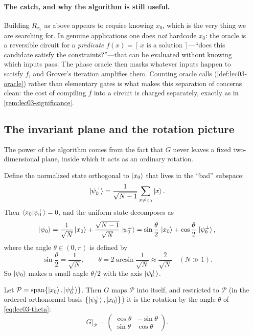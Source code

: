\paragraph{The catch, and why the algorithm is still useful.}
Building $R_{x_0}$ as above appears to require knowing $x_0$, which is the very
thing we are searching for. In genuine applications one does \emph{not} hardcode
$x_0$: the oracle is a reversible circuit for a \emph{predicate}
$f(x)=[\,x\text{ is a solution}\,]$---``does this candidate satisfy the
constraints?''---that can be evaluated without knowing which inputs pass. The
phase oracle then marks whatever inputs happen to satisfy $f$, and Grover's
iteration amplifies them. Counting oracle calls (\cref{def:lec03-oracle}) rather
than elementary gates is what makes this separation of concerns clean: the cost of
compiling $f$ into a circuit is charged separately, exactly as in
\cref{rem:lec03-significance}.

\subsection{The invariant plane and the rotation picture}

The power of the algorithm comes from the fact that $G$ never leaves a fixed
two-dimensional plane, inside which it acts as an ordinary rotation.

Define the normalized state orthogonal to $\ket{x_0}$ that lives in the ``bad''
subspace:
\[
  \ket{\psi_0^{\perp}}
    =\frac{1}{\sqrt{N-1}}\sum_{x\neq x_0}\ket{x}.
\]
Then $\braket{x_0|\psi_0^{\perp}}=0$, and the uniform state decomposes as
\begin{equation}
  \ket{\psi_0}
    =\frac{1}{\sqrt N}\ket{x_0}+\frac{\sqrt{N-1}}{\sqrt N}\ket{\psi_0^{\perp}}
    =\sin\frac{\theta}{2}\,\ket{x_0}+\cos\frac{\theta}{2}\,\ket{\psi_0^{\perp}},
  \label{eq:lec03-initdecomp}
\end{equation}
where the angle $\theta\in(0,\pi)$ is defined by
\begin{equation}
  \sin\frac{\theta}{2}=\frac{1}{\sqrt N},
  \qquad
  \theta=2\arcsin\frac{1}{\sqrt N}\approx\frac{2}{\sqrt N}\quad(N\gg1).
  \label{eq:lec03-theta}
\end{equation}
So $\ket{\psi_0}$ makes a small angle $\theta/2$ with the axis
$\ket{\psi_0^{\perp}}$.

\begin{theorem}
\label{thm:lec03-rotation}
Let $\mathcal{P}=\operatorname{span}\{\ket{x_0},\ket{\psi_0^{\perp}}\}$. Then $G$
maps $\mathcal{P}$ into itself, and restricted to $\mathcal{P}$ (in the ordered
orthonormal basis $\{\ket{\psi_0^{\perp}},\ket{x_0}\}$) it is the rotation by the
angle $\theta$ of \eqref{eq:lec03-theta}:
\[
  G\big|_{\mathcal{P}}
    =\begin{pmatrix}\cos\theta & -\sin\theta\\[2pt]\sin\theta & \cos\theta\end{pmatrix}.
\]
\end{theorem}

